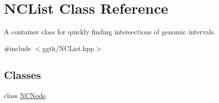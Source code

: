 \hypertarget{classNCList}{}\section{N\+C\+List Class Reference}
\label{classNCList}


A container class for quickly finding intersections of genomic intervals.  




{\ttfamily \#include $<$ggtk/\+N\+C\+List.\+hpp$>$}

\subsection*{Classes}
\begin{DoxyCompactItemize}
\item 
class \hyperlink{classNCList_1_1NCNode}{N\+C\+Node}
\end{DoxyCompactItemize}
